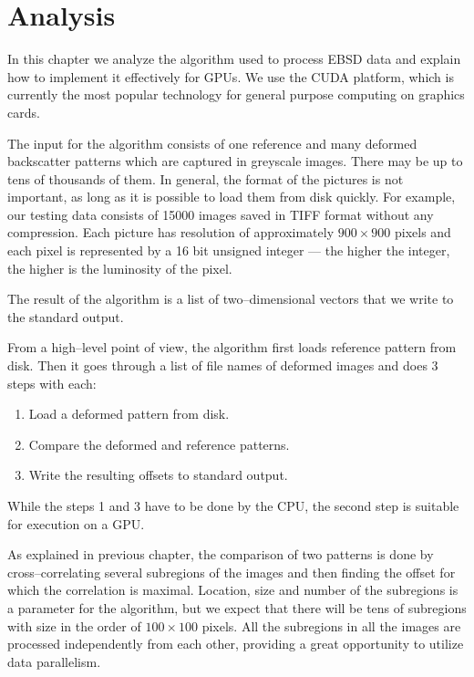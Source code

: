 \chapter{Analysis}

In this chapter we analyze the algorithm used to process EBSD data and explain how to implement it effectively for GPUs. We use the CUDA platform, which is currently the most popular technology for general purpose computing on graphics cards.


The input for the algorithm consists of one reference and many deformed backscatter patterns which are captured in greyscale images. There may be up to tens of thousands of them. In general, the format of the pictures is not important, as long as it is possible to load them from disk quickly. For example, our testing data consists of 15000 images saved in TIFF format without any compression. Each picture has resolution of approximately $900 \times 900$ pixels and each pixel is represented by a 16 bit unsigned integer --- the higher the integer, the higher is the luminosity of the pixel.

The result of the algorithm is a list of two--dimensional vectors that we write to the standard output.

From a high--level point of view, the algorithm first loads reference pattern from disk. Then it goes through a list of file names of deformed images and does 3 steps with each:
\begin{enumerate}
	\item Load a deformed pattern from disk.
	\item Compare the deformed and reference patterns.
	\item Write the resulting offsets to standard output.
\end{enumerate}
While the steps 1 and 3 have to be done by the CPU, the second step is suitable for execution on a GPU.

As explained in previous chapter, the comparison of two patterns is done by cross--correlating several subregions of the images and then finding the offset for which the correlation is maximal. Location, size and number of the subregions is a parameter for the algorithm, but we expect that there will be tens of subregions with size in the order of $100 \times 100$ pixels. All the subregions in all the images are processed independently from each other, providing a great opportunity to utilize data parallelism.

